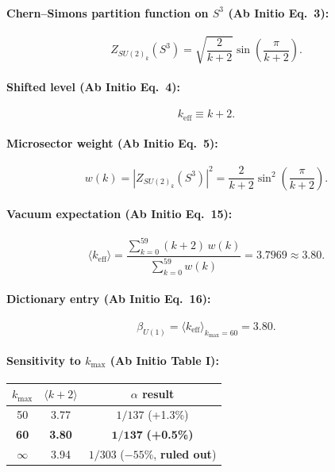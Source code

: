 \documentclass[11pt]{article}
\begin{document}
\paragraph{Chern--Simons partition function on $S^3$ (Ab Initio Eq.~3):}
\begin{equation}\tag{CS-1}
Z_{SU(2)_k}(S^3) = \sqrt{\frac{2}{k+2}}\sin\!\left(\frac{\pi}{k+2}\right).
\end{equation}

\paragraph{Shifted level (Ab Initio Eq.~4):}
\begin{equation}\tag{CS-2}
k_{\mathrm{eff}} \equiv k + 2.
\end{equation}

\paragraph{Microsector weight (Ab Initio Eq.~5):}
\begin{equation}\tag{CS-3}
w(k) = |Z_{SU(2)_k}(S^3)|^2 = \frac{2}{k+2}\sin^2\!\left(\frac{\pi}{k+2}\right).
\end{equation}

\paragraph{Vacuum expectation (Ab Initio Eq.~15):}
\begin{equation}\tag{CS-4}
\boxed{\langle k_{\mathrm{eff}}\rangle = \frac{\sum_{k=0}^{59}(k+2)\,w(k)}{\sum_{k=0}^{59} w(k)} = 3.7969 \approx 3.80.}
\end{equation}

\paragraph{Dictionary entry (Ab Initio Eq.~16):}
\begin{equation}\tag{CS-5}
\boxed{\beta_{U(1)} = \langle k_{\mathrm{eff}}\rangle_{k_{\max}=60} = 3.80.}
\end{equation}

\paragraph{Sensitivity to $k_{\max}$ (Ab Initio Table I):}
\begin{center}
\begin{tabular}{ccc}
\toprule
$k_{\max}$ & $\langle k+2\rangle$ & $\alpha$ result \\
\midrule
50 & 3.77 & $1/137$ (+1.3\%) \\
\textbf{60} & \textbf{3.80} & $\mathbf{1/137}$ \textbf{(+0.5\%)} \\
$\infty$ & 3.94 & $1/303$ ($-55\%$, \textbf{ruled out}) \\
\bottomrule
\end{tabular}
\end{center}
\end{document}
